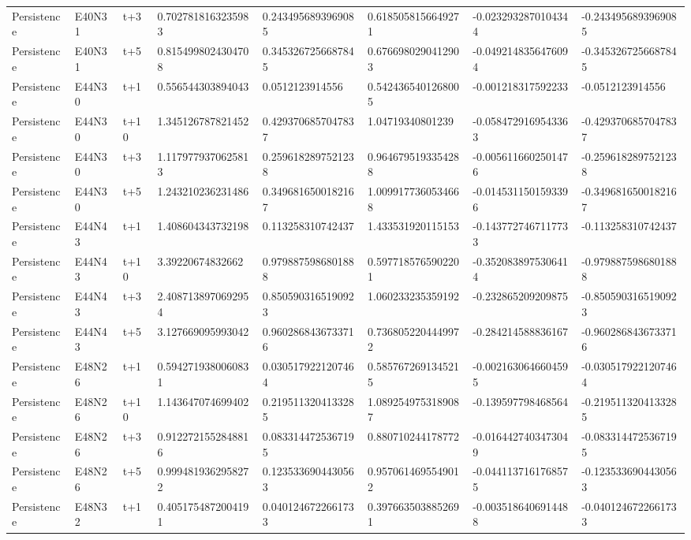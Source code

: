 \begin{landscape}
\begin{longtable}{llllllll}
Persistence & E40N31 & t+3 & 0.7027818163235983 & 0.2434956893969085 & 0.6185058156649271 & -0.0232932870104344 & -0.2434956893969085 \\
Persistence & E40N31 & t+5 & 0.8154998024304708 & 0.3453267256687845 & 0.6766980290412903 & -0.0492148356476094 & -0.3453267256687845 \\
Persistence & E44N30 & t+1 & 0.556544303894043 & 0.0512123914556 & 0.5424365401268005 & -0.001218317592233 & -0.0512123914556 \\
Persistence & E44N30 & t+10 & 1.345126787821452 & 0.4293706857047837 & 1.04719340801239 & -0.0584729169543363 & -0.4293706857047837 \\
Persistence & E44N30 & t+3 & 1.1179779370625813 & 0.2596182897521238 & 0.9646795193354288 & -0.0056116602501476 & -0.2596182897521238 \\
Persistence & E44N30 & t+5 & 1.243210236231486 & 0.3496816500182167 & 1.0099177360534668 & -0.0145311501593396 & -0.3496816500182167 \\
Persistence & E44N43 & t+1 & 1.408604343732198 & 0.113258310742437 & 1.433531920115153 & -0.1437727467117733 & -0.113258310742437 \\
Persistence & E44N43 & t+10 & 3.39220674832662 & 0.9798875986801888 & 0.5977185765902201 & -0.3520838975306414 & -0.9798875986801888 \\
Persistence & E44N43 & t+3 & 2.4087138970692954 & 0.8505903165190923 & 1.060233235359192 & -0.232865209209875 & -0.8505903165190923 \\
Persistence & E44N43 & t+5 & 3.127669095993042 & 0.9602868436733716 & 0.7368052204449972 & -0.284214588836167 & -0.9602868436733716 \\
Persistence & E48N26 & t+1 & 0.5942719380060831 & 0.0305179221207464 & 0.5857672691345215 & -0.0021630646604595 & -0.0305179221207464 \\
Persistence & E48N26 & t+10 & 1.143647074699402 & 0.2195113204133285 & 1.0892549753189087 & -0.139597798468564 & -0.2195113204133285 \\
Persistence & E48N26 & t+3 & 0.9122721552848816 & 0.0833144725367195 & 0.880710244178772 & -0.0164427403473049 & -0.0833144725367195 \\
Persistence & E48N26 & t+5 & 0.9994819362958272 & 0.1235336904430563 & 0.9570614695549012 & -0.0441137161768575 & -0.1235336904430563 \\
Persistence & E48N32 & t+1 & 0.4051754872004191 & 0.0401246722661733 & 0.3976635038852691 & -0.0035186406914488 & -0.0401246722661733 \\

\end{longtable}
\end{landscape}
